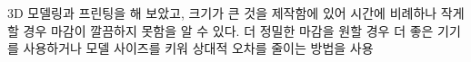 \documentclass[a4paper, 10pt, nanum]{CSUniSchoolLabReport}
\begin{document}
	3D 모델링과 프린팅을 해 보았고, 크기가 큰 것을 제작함에 있어 시간에 비례하나 작게할 경우 마감이 깔끔하지 못함을 알 수 있다. 더 정밀한 마감을 원할 경우 더 좋은 기기를 사용하거나 모델 사이즈를 키워 상대적 오차를 줄이는 방법을 사용



\end{document}
